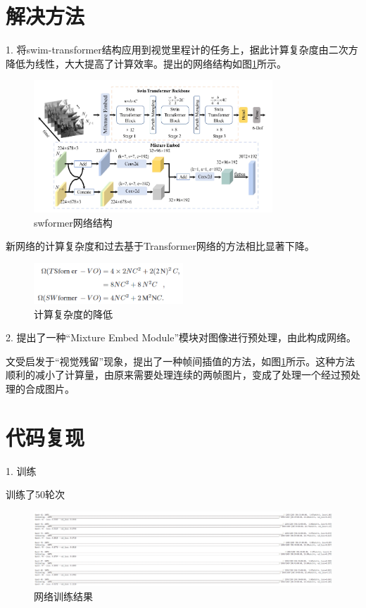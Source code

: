 \section{解决方法}
1. 将swim-transformer结构应用到视觉里程计的任务上，据此计算复杂度由二次方降低为线性，大大提高了计算效率。提出的网络结构如图\ref{fig:sw:1}所示。

\begin{figure}[htbp]
	\centering
	\includegraphics[width=0.8\textwidth]{images/swformer/swformer.png}
	\caption{swformer网络结构}
	\label{fig:sw:1}
\end{figure}

新网络的计算复杂度和过去基于Transformer网络的方法相比显著下降。

\begin{figure}[H]
	\centering
	\includegraphics[width=0.5\textwidth]{images/swformer/swformer_compute.png}
	\caption{计算复杂度的降低}
	\label{fig:sw:2}
\end{figure}

2. 提出了一种“Mixture Embed Module”模块对图像进行预处理，由此构成网络。

文受启发于“视觉残留”现象，提出了一种帧间插值的方法，如图\ref{fig:sw:1}所示。这种方法顺利的减小了计算量，由原来需要处理连续的两帧图片，变成了处理一个经过预处理的合成图片。

\section{代码复现}
1. 训练

训练了50轮次
\begin{figure}[htbp]
	\centering
	\includegraphics[width=\textwidth]{images/swformer/train.png}
	\caption{网络训练结果}
	\label{fig:sw:3}
\end{figure}

